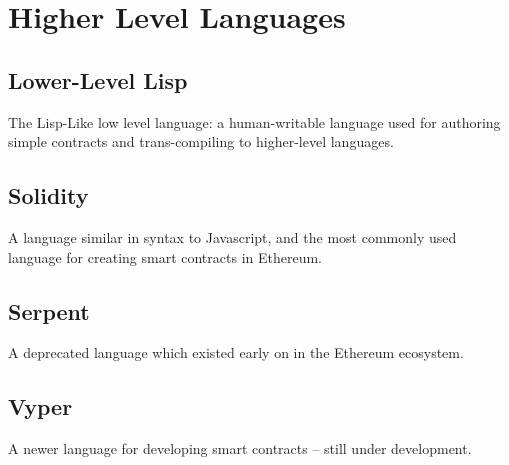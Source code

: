 \documentclass[10pt,letterpaper,leqno,bibliography=totoc]{scrartcl}
\newenvironment{alphafootnotes}
{\par\edef\savedfootnotenumber{\number\value{footnote}}
\renewcommand{\thefootnote}{\alph{footnote}}
\setcounter{footnote}{0}}
{\par\setcounter{footnote}{\savedfootnotenumber}}
\begin{document}
\begin{alphafootnotes}
		
	\section{Higher Level Languages}
		\subsection{Lower-Level Lisp}
			The Lisp-Like low level language: a human-writable language used for authoring simple contracts and trans-compiling to higher-level languages.	
		\subsection{Solidity}
			A language similar in syntax to Javascript, and the most commonly used language for creating smart contracts in Ethereum.
		\subsection{Serpent}
			A deprecated language which existed early on in the Ethereum ecosystem.
		\subsection{Vyper}
			A newer language for developing smart contracts -- still under development.



\clearpage
\begin{multicols*}{2}
\printbibliography
\clearpage
\printglossary[type=\acronymtype]
\glsaddall
\printnoidxglossaries
\clearpage
\end{multicols*}
\end{alphafootnotes}

\printindex
\end{document}
